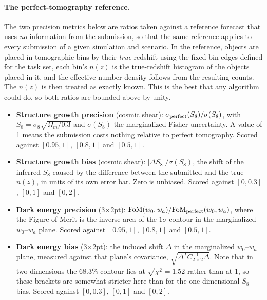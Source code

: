 \documentclass[11pt,twoside,letterpaper,onecolumn,english]{article}
\begin{document}
\paragraph{The perfect-tomography reference.}
The two precision metrics below are ratios taken against a reference
forecast that uses \emph{no} information from the submission, so that
the same reference applies to every submission of a given simulation
and scenario.  In the reference, objects are placed in tomographic
bins by their \emph{true} redshift using the fixed bin edges defined
for the task set, each bin's $n(z)$ is the true-redshift histogram of
the objects placed in it, and the effective number density follows
from the resulting counts.  The $n(z)$ is then treated as exactly
known.  This is the best that any algorithm could do, so both ratios
are bounded above by unity.

\begin{itemize}
    \item \textbf{Structure growth precision} (cosmic shear):
      $\sigma_{\rm perfect}(S_8) / \sigma(S_8)$, with
      $S_8 = \sigma_8\sqrt{\Omega_m/0.3}$ and $\sigma(S_8)$ the
      marginalized Fisher uncertainty.  A value of 1 means the
      submission costs nothing relative to perfect tomography.
      Scored against $[0.95, 1]$, $[0.8, 1]$ and $[0.5, 1]$.
    \item \textbf{Structure growth bias} (cosmic shear):
      $|\Delta S_8| / \sigma(S_8)$, the shift of the inferred $S_8$
      caused by the difference between the submitted and the true
      $n(z)$, in units of its own error bar.  Zero is unbiased.
      Scored against $[0, 0.3]$, $[0, 1]$ and $[0, 2]$.
    \item \textbf{Dark energy precision} (3$\times$2pt):
      ${\rm FoM}(w_0, w_a) / {\rm FoM}_{\rm perfect}(w_0, w_a)$, where
      the Figure of Merit is the inverse area of the $1\sigma$ contour
      in the marginalized $w_0$--$w_a$ plane.
      Scored against $[0.95, 1]$, $[0.8, 1]$ and $[0.5, 1]$.
    \item \textbf{Dark energy bias} (3$\times$2pt): the induced shift
      $\Delta$ in the marginalized $w_0$--$w_a$ plane, measured
      against that plane's covariance,
      $\sqrt{\Delta^{T} C_{2\times2}^{-1} \Delta}$.  Note that in two
      dimensions the $68.3\%$ contour lies at $\sqrt{\chi^2} = 1.52$
      rather than at 1, so these brackets are somewhat stricter here
      than for the one-dimensional $S_8$ bias.
      Scored against $[0, 0.3]$, $[0, 1]$ and $[0, 2]$.
\end{itemize}
\end{document}
